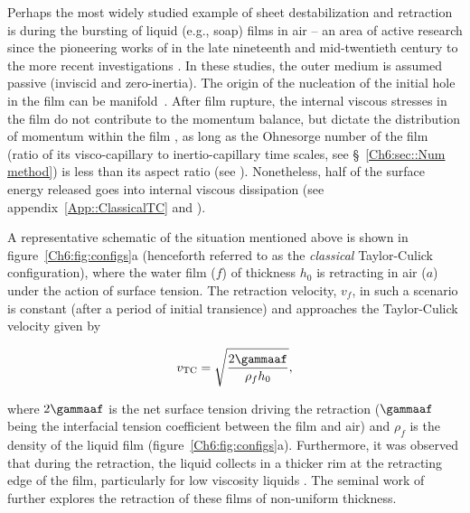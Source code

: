 Perhaps the most widely studied example of sheet destabilization and retraction is during the bursting of liquid (e.g., soap) films in air -- an area of active research since the pioneering works of \citet{dupre1867theorie, dupre1869theorie, rayleigh-1891-nature, taylor-1959-procrsoclonda, culick-1960-japplphys, mcentee-1969-jphyschem} in the late nineteenth and mid-twentieth century to the more recent investigations \citep{bremond-2005-jfm, muller-2007-prl, lhuissier2012bursting, munro-2015-jfm, deka2020revisiting}. In these studies, the outer medium is assumed passive (inviscid and zero-inertia). The origin of the nucleation of the initial hole in the film can be manifold~\citep{lohse-2020-pnas}. After film rupture, the internal viscous stresses in the film do not contribute to the momentum balance, but dictate the distribution of momentum within the film \citep{savva-2009-jfm}, as long as the Ohnesorge number of the film (ratio of its visco-capillary to inertio-capillary time scales, see \S~\ref{Ch6:sec::Num method}) is less than its aspect ratio (see \citet{deka2020revisiting}). Nonetheless, half of the surface energy released goes into internal viscous dissipation (see appendix~\ref{App::ClassicalTC} and \citep{culick-1960-japplphys,de1996introductory, sunderhauf-2002-pof, villermaux2020fragmentation}). 

A representative schematic of the situation mentioned above is shown in figure~\ref{Ch6:fig:configs}a (henceforth referred to as the \emph{classical} Taylor-Culick configuration), where the water film ($f$) of thickness $h_0$ is retracting in air ($a$) under the action of surface tension. The retraction velocity, $v_f$, in such a scenario is constant (after a period of initial transience) and approaches the Taylor-Culick velocity given by

\begin{align}
	v_{\text{TC}} = \sqrt{\frac{2\gammaaf}{\rho_f h_0}} ,
	\label{ch6:eq:v_TC}
\end{align}

\noindent where $2\gammaaf$ is the net surface tension driving the retraction ($\gammaaf$ being the interfacial tension coefficient between the film and air) and $\rho_f$ is the density of the liquid film (figure~\ref{Ch6:fig:configs}a). Furthermore, it was observed that during the retraction, the liquid collects in a thicker rim at the retracting edge of the film, particularly for low viscosity liquids \citep[not depicted in figure~\ref{Ch6:fig:configs}a]{rayleigh-1891-nature, ranz-1959-japplphys, pandit-1990-jfm}. The seminal work of \citet{keller-1983-pof} further explores the retraction of these films of non-uniform thickness. 

